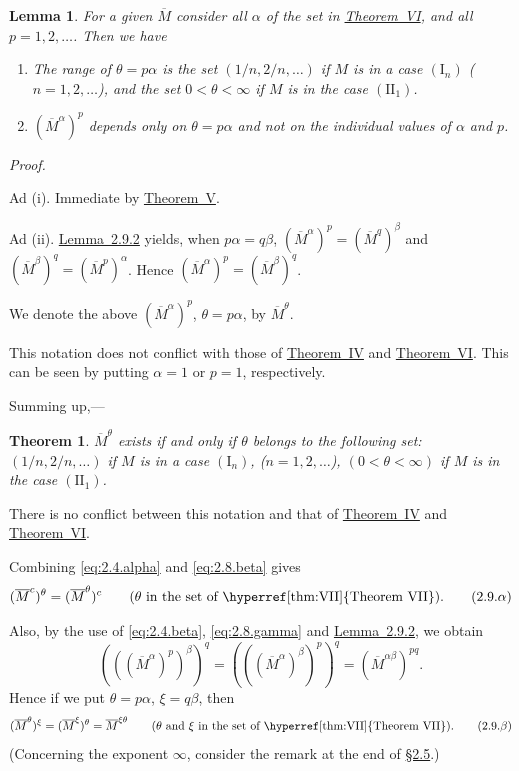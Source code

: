 \documentclass[b5paper,twoside]{article}
\newcommand{\secref}[2]{\hyperref[#1]{\mbox{\S#2}}}
\newcommand{\thmref}[2]{\hyperref[#1]{\mbox{Theorem~#2}}}
\newcommand{\lemref}[2]{\hyperref[#1]{\mbox{Lemma~#2}}}
\theoremstyle{mvnplain}
\newtheorem{theorem}{Theorem}
\newtheorem{lemma}{Lemma}[section]
\renewenvironment{proof}[1][Proof]{%
  \par\addvspace{0.35\baselineskip}%
  \noindent\textit{#1.}\ \normalfont\ignorespaces
}{%
  \par\addvspace{0.35\baselineskip}%
}
\newcommand{\M}{\mathbf M}
\def\M{M}%
\begin{document}
\begin{lemma}\label{lem:2.9.3}
For a given $\overline{\M}$ consider all $\alpha$ of the set in
\thmref{thm:VI}{VI}, and all $p=1,2,\ldots$.  Then we have
\begin{enumerate}[label=(\roman*)]
\item The range of $\theta=p\alpha$ is the set
$(1/n,2/n,\ldots)$ if $\M$ is in a case $(\mathrm I_n)$
($n=1,2,\ldots$), and the set $0<\theta<\infty$ if $\M$ is in the case
$(\mathrm{II}_1)$.
\item $(\overline{\M}^{\alpha})^{p}$ depends only on $\theta=p\alpha$ and
not on the individual values of $\alpha$ and $p$.
\end{enumerate}
\end{lemma}
\begin{proof}
Ad (i).  Immediate by \thmref{thm:V}{V}.

Ad (ii).  \lemref{lem:2.9.2}{2.9.2} yields, when $p\alpha=q\beta$,
$(\overline{\M}^{\alpha})^{p}=(\overline{\M}^{q})^{\beta}$ and
$(\overline{\M}^{\beta})^{q}=(\overline{\M}^{p})^{\alpha}$.  Hence
$(\overline{\M}^{\alpha})^{p}=(\overline{\M}^{\beta})^{q}$.
\end{proof}

We denote the above $(\overline{\M}^{\alpha})^{p}$, $\theta=p\alpha$, by
$\overline{\M}^{\theta}$.

This notation does not conflict with those of \thmref{thm:IV}{IV} and
\thmref{thm:VI}{VI}.  This can be seen by putting $\alpha=1$ or $p=1$,
respectively.

Summing up,---
\begin{theorem}\label{thm:VII}
$\overline{\M}^{\theta}$ exists if and only if $\theta$ belongs to the
following set: $(1/n,2/n,\ldots)$ if $\M$ is in a case $(\mathrm I_n)$,
($n=1,2,\ldots$), $(0<\theta<\infty)$ if $\M$ is in the case
$(\mathrm{II}_1)$.
\end{theorem}
There is no conflict between this notation and that of \thmref{thm:IV}{IV}
and \thmref{thm:VI}{VI}.

Combining \eqref{eq:2.4.alpha} and \eqref{eq:2.8.beta} gives
\begin{equation}
  (\overline{\M}^{c})^{\theta}=(\overline{\M}^{\theta})^{c}
  \qquad(\theta\text{ in the set of \thmref{thm:VII}{VII}}).
  \tag{2.9.\ensuremath{\alpha}}\label{eq:2.9.alpha}
\end{equation}

Also, by the use of \eqref{eq:2.4.beta}, \eqref{eq:2.8.gamma} and
\lemref{lem:2.9.2}{2.9.2}, we obtain
\[
  \left(((\overline{\M}^{\alpha})^{p})^{\beta}\right)^{q}
  =\left(((\overline{\M}^{\alpha})^{\beta})^{p}\right)^{q}
  =(\overline{\M}^{\alpha\beta})^{pq}.
\]
Hence if we put $\theta=p\alpha$, $\xi=q\beta$, then
\begin{equation}
  (\overline{\M}^{\theta})^{\xi}
  =(\overline{\M}^{\xi})^{\theta}
  =\overline{\M}^{\xi\theta}
  \qquad(\theta\text{ and }\xi\text{ in the set of
  \thmref{thm:VII}{VII}}).
  \tag{2.9.\ensuremath{\beta}}\label{eq:2.9.beta}
\end{equation}
(Concerning the exponent $\infty$, consider the remark at the end of
\secref{sec:2.5}{2.5}.)
\end{document}
